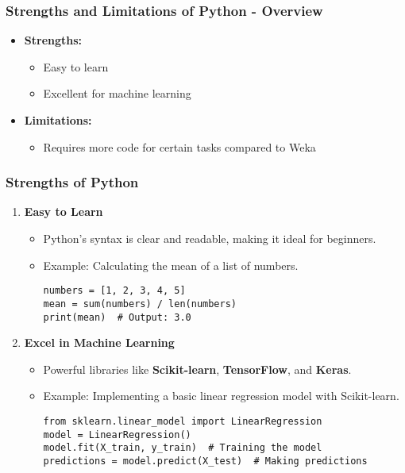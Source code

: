 \documentclass[aspectratio=169]{beamer}
\begin{document}
\begin{frame}[fragile]
    \frametitle{Strengths and Limitations of Python - Overview}
    \begin{itemize}
        \item \textbf{Strengths:}
        \begin{itemize}
            \item Easy to learn
            \item Excellent for machine learning
        \end{itemize}
        \item \textbf{Limitations:}
        \begin{itemize}
            \item Requires more code for certain tasks compared to Weka
        \end{itemize}
    \end{itemize}
\end{frame}

\begin{frame}[fragile]
    \frametitle{Strengths of Python}
    \begin{enumerate}
        \item \textbf{Easy to Learn}
        \begin{itemize}
            \item Python's syntax is clear and readable, making it ideal for beginners.
            \item Example: Calculating the mean of a list of numbers.
            \begin{lstlisting}
numbers = [1, 2, 3, 4, 5]
mean = sum(numbers) / len(numbers)
print(mean)  # Output: 3.0
            \end{lstlisting}
        \end{itemize}

        \item \textbf{Excel in Machine Learning}
        \begin{itemize}
            \item Powerful libraries like \textbf{Scikit-learn}, \textbf{TensorFlow}, and \textbf{Keras}.
            \item Example: Implementing a basic linear regression model with Scikit-learn.
            \begin{lstlisting}
from sklearn.linear_model import LinearRegression
model = LinearRegression()
model.fit(X_train, y_train)  # Training the model
predictions = model.predict(X_test)  # Making predictions
            \end{lstlisting}
        \end{itemize}
    \end{enumerate}
\end{frame}
\end{document}
